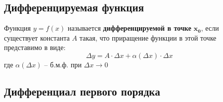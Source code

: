 \subsection{Дифференцируемая функция}

\begin{definition}
  Функция $y=f(x)$ называется \textbf{дифференцируемой в точке} $\bm{x_0}$, если существует константа $A$ такая, что приращение функции в этой точке представимо в виде: \[ \boxed{\Delta y = A\cdot \Delta x + \alpha (\Delta x) \cdot \Delta x} \]
  где $\alpha (\Delta x)$ -- б.м.ф. при $\Delta x \to 0$
\end{definition}

\newpage
\subsection{Дифференциал первого порядка}

